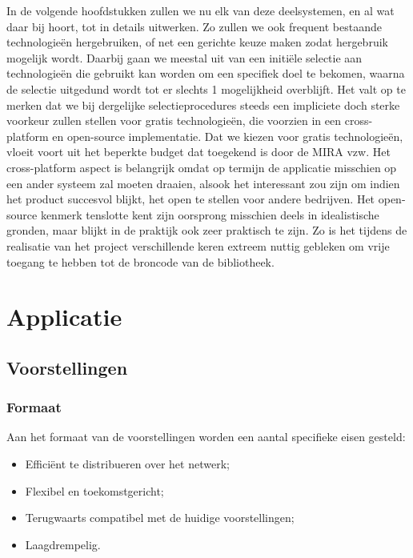 In de volgende hoofdstukken zullen we nu elk van deze deelsystemen, en al wat daar bij hoort, tot in details uitwerken. Zo zullen we ook frequent bestaande technologieën hergebruiken, of net een gerichte keuze maken zodat hergebruik mogelijk wordt. Daarbij gaan we meestal uit van een initiële selectie aan technologieën die gebruikt kan worden om een specifiek doel te bekomen, waarna de selectie uitgedund wordt tot er slechts 1 mogelijkheid overblijft. Het valt op te merken dat we bij dergelijke selectieprocedures steeds een impliciete doch sterke voorkeur zullen stellen voor gratis technologieën, die voorzien in een cross-platform en open-source implementatie. Dat we kiezen voor gratis technologieën, vloeit voort uit het beperkte budget dat toegekend is door de MIRA vzw. Het cross-platform aspect is belangrijk omdat op termijn de applicatie misschien op een ander systeem zal moeten draaien, alsook het interessant zou zijn om indien het product succesvol blijkt, het open te stellen voor andere bedrijven. Het open-source kenmerk tenslotte kent zijn oorsprong misschien deels in idealistische gronden, maar blijkt in de praktijk ook zeer praktisch te zijn. Zo is het tijdens de realisatie van het project verschillende keren extreem nuttig gebleken om vrije toegang te hebben tot de broncode van de bibliotheek.


%
%

\chapter{Applicatie}
\label{chap:applicatie}

\section{Voorstellingen}
\label{sec:voorstellingen}

\subsection{Formaat}

Aan het formaat van de voorstellingen worden een aantal specifieke eisen gesteld:
\begin{itemize}
\item Efficiënt te distribueren over het netwerk;
\item Flexibel en toekomstgericht;
\item Terugwaarts compatibel met de huidige voorstellingen;
\item Laagdrempelig.
\end{itemize}

